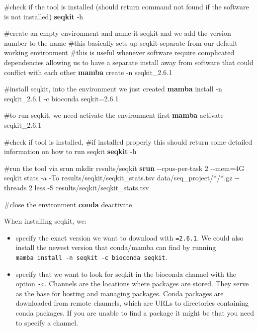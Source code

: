 \documentclass[
  letterpaper,
  DIV=11,
  numbers=noendperiod]{scrreprt}
\newenvironment{Shaded}{}{}
\newcommand{\AttributeTok}[1]{\textcolor[rgb]{0.84,0.23,0.29}{#1}}
\newcommand{\CommentTok}[1]{\textcolor[rgb]{0.42,0.45,0.49}{#1}}
\newcommand{\ExtensionTok}[1]{\textcolor[rgb]{0.84,0.23,0.29}{\textbf{#1}}}
\newcommand{\FunctionTok}[1]{\textcolor[rgb]{0.44,0.26,0.76}{#1}}
\newcommand{\NormalTok}[1]{\textcolor[rgb]{0.14,0.16,0.18}{#1}}
\newcommand{\OperatorTok}[1]{\textcolor[rgb]{0.14,0.16,0.18}{#1}}
\newcommand{\PreprocessorTok}[1]{\textcolor[rgb]{0.84,0.23,0.29}{#1}}
\begin{document}
\begin{Shaded}
\begin{Highlighting}[]
\CommentTok{\#check if the tool is installed (should return command not found if the software is not installed)}
\ExtensionTok{seqkit} \AttributeTok{{-}h}

\CommentTok{\#create an empty environment and name it seqkit and we add the version number to the name}
\CommentTok{\#this basically sets up seqkit separate from our default working environment}
\CommentTok{\#this is useful whenever software require complicated dependencies allowing us to have a separate install away from software that could conflict with each other}
\ExtensionTok{mamba}\NormalTok{ create }\AttributeTok{{-}n}\NormalTok{ seqkit\_2.6.1}

\CommentTok{\#install seqkit, into the environment we just created}
\ExtensionTok{mamba}\NormalTok{ install }\AttributeTok{{-}n}\NormalTok{ seqkit\_2.6.1 }\AttributeTok{{-}c}\NormalTok{ bioconda seqkit=2.6.1}

\CommentTok{\#to run seqkit, we need activate the environment first}
\ExtensionTok{mamba}\NormalTok{ activate seqkit\_2.6.1}

\CommentTok{\#check if tool is installed, }
\CommentTok{\#if installed properly this should return some detailed information on how to run seqkit}
\ExtensionTok{seqkit} \AttributeTok{{-}h}

\CommentTok{\#run the tool via srun}
\FunctionTok{mkdir}\NormalTok{ results/seqkit}
\ExtensionTok{srun} \AttributeTok{{-}{-}cpus{-}per{-}task}\NormalTok{ 2 }\AttributeTok{{-}{-}mem}\OperatorTok{=}\NormalTok{4G seqkit stats }\AttributeTok{{-}a} \AttributeTok{{-}To}\NormalTok{ results/seqkit/seqkit\_stats.tsv data/seq\_project/}\PreprocessorTok{*}\NormalTok{/}\PreprocessorTok{*}\NormalTok{.gz }\AttributeTok{{-}{-}threads}\NormalTok{ 2}
\FunctionTok{less} \AttributeTok{{-}S}\NormalTok{ results/seqkit/seqkit\_stats.tsv }

\CommentTok{\#close the environment}
\ExtensionTok{conda}\NormalTok{ deactivate}
\end{Highlighting}
\end{Shaded}

When installing seqkit, we:

\begin{itemize}
\item
  specify the exact version we want to download with \texttt{=2.6.1}. We
  could also install the newest version that conda/mamba can find by
  running \texttt{mamba\ install\ -n\ seqkit\ -c\ bioconda\ seqkit}.
\item
  specify that we want to look for seqkit in the bioconda channel with
  the option \texttt{-c}. Channels are the locations where packages are
  stored. They serve as the base for hosting and managing packages.
  Conda packages are downloaded from remote channels, which are URLs to
  directories containing conda packages. If you are unable to find a
  package it might be that you need to specify a channel.
\end{itemize}
\end{document}
